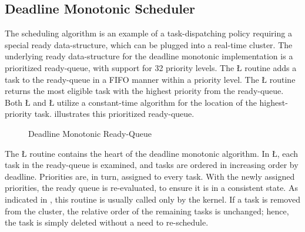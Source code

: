 \documentclass[openright,twoside]{report}
\begin{document}
\subsection{Deadline Monotonic Scheduler}
\label{s:DeadlineMonotonicScheduler}

The  scheduling algorithm is an example of a task-dispatching policy requiring a special ready data-structure, which can be plugged into a real-time cluster.
The underlying ready data-structure for the deadline monotonic implementation is a prioritized ready-queue, with support for 32 priority levels.
The \LGinlinetrue\LGbegin\lgrinde\L{}\endlgrinde\LGend{} routine adds a task to the ready-queue in a FIFO manner within a priority level.
The \LGinlinetrue\LGbegin\lgrinde\L{}\endlgrinde\LGend{} routine returns the most eligible task with the highest priority from the ready-queue.
Both \LGinlinetrue\LGbegin\lgrinde\L{}\endlgrinde\LGend{} and \LGinlinetrue\LGbegin\lgrinde\L{}\endlgrinde\LGend{} utilize a constant-time algorithm for the location of the highest-priority task.
 illustrates this prioritized ready-queue.

\begin{figure}
\centering

\caption{Deadline Monotonic Ready-Queue}
\label{f:DeadlineMonotonicReady-Queue}
\end{figure}

The \LGinlinetrue\LGbegin\lgrinde\L{}\endlgrinde\LGend{} routine contains the heart of the deadline monotonic algorithm.
In \LGinlinetrue\LGbegin\lgrinde\L{}\endlgrinde\LGend{}, each task in the ready-queue is examined, and tasks are ordered in increasing order by deadline.
Priorities are, in turn, assigned to every task.
With the newly assigned priorities, the ready queue is re-evaluated, to ensure it is in a consistent state.  
As indicated in , this routine is usually called only by the kernel.
If a task is removed from the cluster, the relative order of the remaining tasks is unchanged;
hence, the task is simply deleted without a need to re-schedule.
\end{document}
